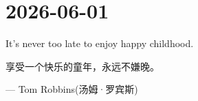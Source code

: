 \section*{2026-06-01}
It's never too late to enjoy happy childhood. \par
享受一个快乐的童年，永远不嫌晚。 \par
\hfill --- Tom Robbins(汤姆·罗宾斯) \par
